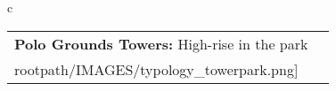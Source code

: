 \begin{table}[H]
        \begin{tabular}{c}
        \begin{tabular}{m{1.5in} m{2in}}
\textbf{Polo Grounds Towers:} {High-rise in the park} & \texttt{[image: \\rootpath/IMAGES/typology\_towerpark.png]}
\end{tabular}\end{tabular}
        \end{table}